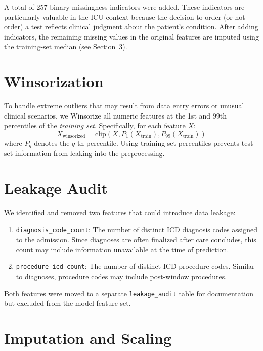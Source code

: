 \documentclass[11pt,a4paper]{report}
\begin{document}
A total of 257 binary missingness indicators were added. These indicators are particularly valuable in the ICU context because the decision to order (or not order) a test reflects clinical judgment about the patient's condition. After adding indicators, the remaining missing values in the original features are imputed using the training-set median (see Section~\ref{sec:imputation}).

\section{Winsorization}

To handle extreme outliers that may result from data entry errors or unusual clinical scenarios, we Winsorize all numeric features at the 1st and 99th percentiles of the \emph{training set}. Specifically, for each feature $X$:
\begin{equation}
X_{\text{winsorized}} = \text{clip}(X, P_1(X_{\text{train}}), P_{99}(X_{\text{train}}))
\end{equation}
where $P_q$ denotes the $q$-th percentile. Using training-set percentiles prevents test-set information from leaking into the preprocessing.

\section{Leakage Audit}
\label{sec:leakage}

We identified and removed two features that could introduce data leakage:
\begin{enumerate}[leftmargin=2em]
\item \texttt{diagnosis\_code\_count}: The number of distinct ICD diagnosis codes assigned to the admission. Since diagnoses are often finalized after care concludes, this count may include information unavailable at the time of prediction.
\item \texttt{procedure\_icd\_count}: The number of distinct ICD procedure codes. Similar to diagnoses, procedure codes may include post-window procedures.
\end{enumerate}

Both features were moved to a separate \texttt{leakage\_audit} table for documentation but excluded from the model feature set.

\section{Imputation and Scaling}
\label{sec:imputation}
\end{document}
